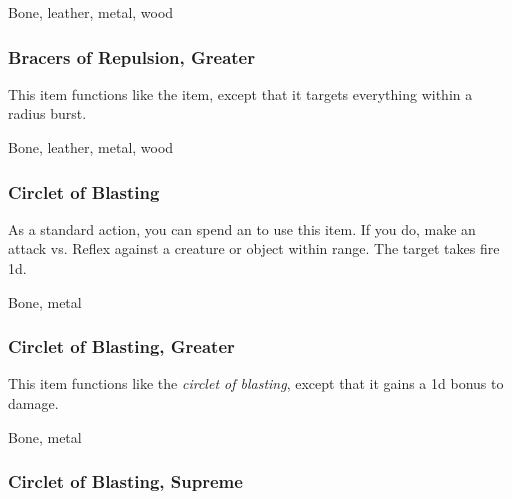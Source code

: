  Bone, leather, metal, wood


\lowercase{\hypertarget{item:Bracers of Repulsion, Greater}{}}\label{item:Bracers of Repulsion, Greater}
\hypertarget{item:Bracers of Repulsion, Greater}{\subsubsection{Bracers of Repulsion, Greater\hfill{}}}

This item functions like the  item, except that it targets everything within a \arealarge radius burst.



 Bone, leather, metal, wood


\lowercase{\hypertarget{item:Circlet of Blasting}{}}\label{item:Circlet of Blasting}
\hypertarget{item:Circlet of Blasting}{\subsubsection{Circlet of Blasting\hfill{}}}

As a standard action, you can spend an  to use this item.
If you do, make an attack vs. Reflex against a creature or object within \rngmed range.
\hit The target takes fire  \plus1d.



 


 Bone, metal


\lowercase{\hypertarget{item:Circlet of Blasting, Greater}{}}\label{item:Circlet of Blasting, Greater}
\hypertarget{item:Circlet of Blasting, Greater}{\subsubsection{Circlet of Blasting, Greater\hfill{}}}

This item functions like the \textit{circlet of blasting}, except that it gains a \plus1d bonus to damage.



 


 Bone, metal


\lowercase{\hypertarget{item:Circlet of Blasting, Supreme}{}}\label{item:Circlet of Blasting, Supreme}
\hypertarget{item:Circlet of Blasting, Supreme}{\subsubsection{Circlet of Blasting, Supreme\hfill{}}}

